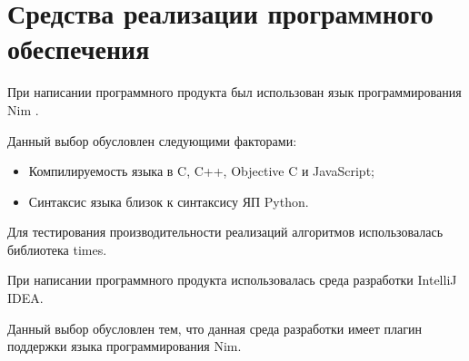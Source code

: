 \documentclass[12pt]{report}
\begin{document}
\section{Средства реализации программного обеспечения}
При написании программного продукта был использован язык программирования Nim \cite{Nim}.

Данный выбор обусловлен следующими факторами:
\begin{itemize}
\item Компилируемость языка в C, C++, Objective C и JavaScript;
\item Синтаксис языка близок к синтаксису ЯП Python.
\end{itemize}

Для тестирования производительности реализаций алгоритмов использовалась библиотека times.

При написании программного продукта использовалась среда разработки IntelliJ IDEA.

Данный выбор обусловлен тем, что данная среда разработки имеет плагин поддержки языка программирования Nim.
\end{document}
